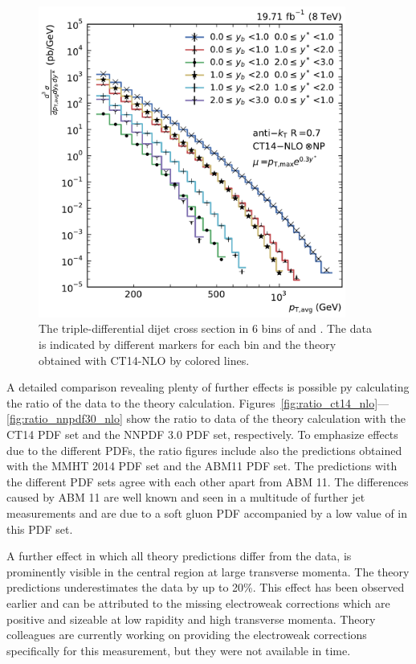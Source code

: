 \begin{figure}[h!tbp]
    \centering
    \includegraphics[width=0.9\textwidth]{figures/measurement/ptavg_spectrum.pdf}\hfill
    \caption[Spectrum of the Triple-differential Dijet Cross Section]{The
    triple-differential dijet cross section in 6 bins of \ystar and \yboost. The
    data is indicated by different markers for each bin and the theory obtained with CT14-NLO by
    colored lines.}
    \label{fig:measurement_result}
\end{figure}

A detailed comparison revealing plenty of further effects is possible py
calculating the ratio of the data to the theory calculation.
Figures~\ref{fig:ratio_ct14_nlo}---\ref{fig:ratio_nnpdf30_nlo} show the ratio to
data of the theory calculation with the CT14 PDF set and the NNPDF 3.0 PDF set,
respectively. To emphasize effects due to the different PDFs, the ratio figures
include also the predictions obtained with the MMHT 2014 PDF set and the ABM11
PDF set. The predictions with the different PDF sets agree with each other apart
from ABM 11. The differences caused by ABM 11 are well known and seen in a
multitude of further jet measurements and are due to a soft gluon PDF
accompanied by a low value of \asmz in this PDF set. 

A further effect in which all theory predictions differ from the data, is
prominently visible in the central region at large transverse momenta. The
theory predictions underestimates the data by up to 20\%. This effect has been
observed earlier and can be attributed to the missing electroweak corrections
which are positive and sizeable at low rapidity and high transverse momenta.
Theory colleagues are currently working on providing the electroweak corrections
specifically for this measurement, but they were not available in
time.

